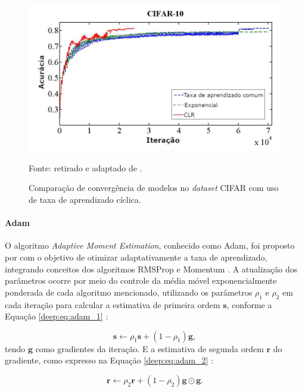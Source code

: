 \begin{figure}[H]
    \centering
    \caption{Comparação de convergência de modelos no \textit{dataset} CIFAR \citep{Krizhevsky2014TheDataset} com uso de taxa de aprendizado cíclica.}
    \includegraphics[width=0.8\linewidth]{recursos/imagens/deep/cifar_lr.png}
    \label{deep:optimization:cyclical_lr}

    Fonte: retirado e adaptado de \cite{Smith2017CyclicalNetworks}.
\end{figure}

\paragraph{Adam}
\label{deep:optimization:adam}

O algoritmo \textit{Adaptive Moment Estimation}, conhecido como Adam, foi proposto por \cite{Kingma2014Adam:Optimization} com o objetivo de otimizar adaptativamente a taxa de aprendizado, integrando conceitos dos algoritmos RMSProp \citep{Hinton2012NeuralDescent} e Momentum \citep{Polyak1964SomeMethods}. A atualização dos parâmetros ocorre por meio do controle da média móvel exponencialmente ponderada de cada algoritmo mencionado, utilizando os parâmetros $\rho_{1}$ e $\rho_{2}$ em cada iteração para calcular a estimativa de primeira ordem $\boldsymbol{s}$, conforme a Equação \ref{deep:eq:adam_1} \citep{Goodfellow2016}:

\begin{equation}
    \label{deep:eq:adam_1}
    \boldsymbol{s} \leftarrow \rho_{1} \boldsymbol{s} + (1 - \rho_{1})\boldsymbol{g},
\end{equation}
tendo $\boldsymbol{g}$ como gradientes da iteração. E a estimativa de segunda ordem $\boldsymbol{r}$ do gradiente, como expresso na Equação \ref{deep:eq:adam_2} \citep{Goodfellow2016}:

\begin{equation}
    \label{deep:eq:adam_2}
    \boldsymbol{r} \leftarrow \rho_{2} \boldsymbol{r} + (1 - \rho_{2})\boldsymbol{g} \odot \boldsymbol{g}.
\end{equation}

